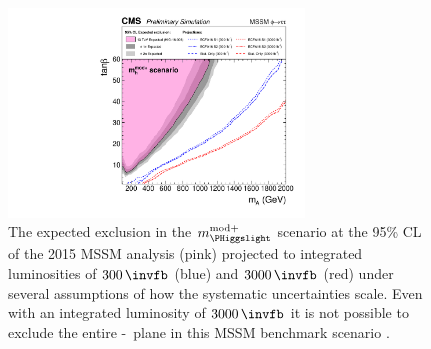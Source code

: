 \begin{figure}[h!]
\begin{center}
\includegraphics[width=0.7\textwidth]{./Conclusion/Figures/scenario_comp2.pdf}
\end{center}
\caption[The expected exclusion in the $m_{\PHiggslight}^{\text{mod+}}$ scenario
at the 95\% CL of the 2015 MSSM analysis, projected to an integrated luminosity of $300$ and $3000\,\invfb$.]{The expected exclusion in the $m_{\PHiggslight}^{\text{mod+}}$ scenario
 at the 95\% CL of the 2015 MSSM analysis (pink)
projected to integrated luminosities of $300\,\invfb$ (blue) and $3000\,\invfb$ (red)
under several assumptions of how the systematic uncertainties scale. Even with an integrated 
luminosity of $3000\,\invfb$ it is not possible to exclude the entire \mA-\tanb~plane
in this \ac{MSSM} benchmark scenario \cite{HTT-projection}.}
\label{fig:mssm_projection_fig}
\end{figure}

